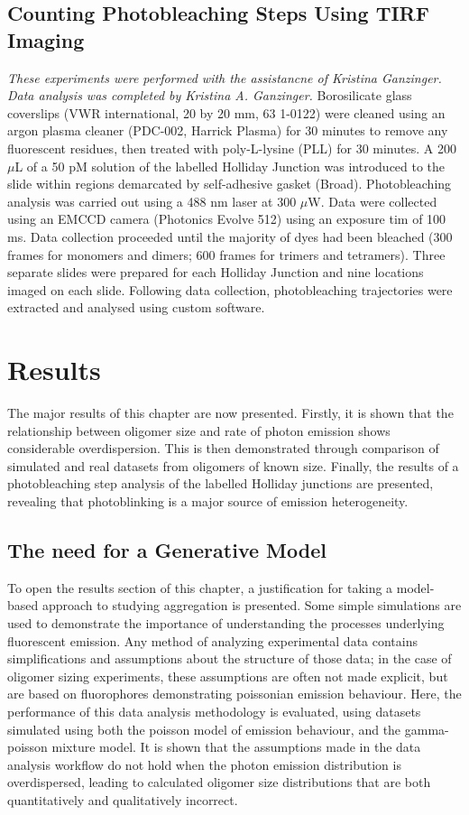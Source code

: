 \subsection{Counting Photobleaching Steps Using TIRF Imaging}
\textit{These experiments were performed with the assistancne of Kristina Ganzinger. Data analysis was completed by Kristina A. Ganzinger.}
Borosilicate glass coverslips (VWR international, 20 by 20 mm, 63 1-0122) were cleaned using an argon plasma cleaner (PDC-002, Harrick Plasma) for 30 minutes to remove any fluorescent residues, then treated with poly-L-lysine (PLL) for 30 minutes. A 200 $\mu$L of a 50 pM solution of the labelled Holliday Junction was introduced to the slide within regions demarcated by self-adhesive gasket (Broad). Photobleaching analysis was carried out using a 488 nm laser at 300 $\mu$W. Data were collected using an EMCCD camera (Photonics Evolve 512) using an exposure tim of 100 ms. Data collection proceeded until the majority of dyes had been bleached (300 frames for monomers and dimers; 600 frames for trimers and tetramers). Three separate slides were prepared for each Holliday Junction and nine locations imaged on each slide. Following data collection, photobleaching trajectories were extracted and analysed using custom software.

\section{Results}
The major results of this chapter are now presented. Firstly, it is shown that the relationship between oligomer size and rate of photon emission shows considerable overdispersion. This is then demonstrated through comparison of simulated and real datasets from oligomers of known size. Finally, the results of a photobleaching step analysis of the labelled Holliday junctions are presented, revealing that photoblinking is a major source of emission heterogeneity.

\subsection{The need for a Generative Model}
\label{sect:generative_model}
To open the results section of this chapter, a justification for taking a model-based approach to studying aggregation is presented. Some simple simulations are used to demonstrate the importance of understanding the processes underlying fluorescent emission. Any method of analyzing experimental data contains simplifications and assumptions about the structure of those data; in the case of oligomer sizing experiments, these assumptions are often not made explicit, but are based on fluorophores demonstrating poissonian emission behaviour. Here, the performance of this data analysis methodology is evaluated, using datasets simulated using both the poisson model of emission behaviour, and the gamma-poisson mixture model. It is shown that the assumptions made in the data analysis workflow do not hold when the photon emission distribution is overdispersed, leading to calculated oligomer size distributions that are both quantitatively and qualitatively incorrect. 

